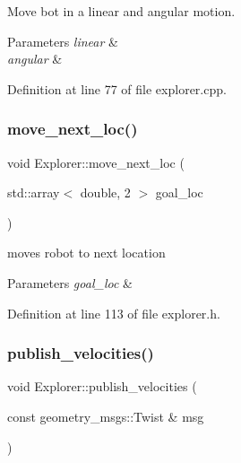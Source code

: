 Move bot in a linear and angular motion. 


\begin{DoxyParams}{Parameters}
{\em linear} & \\
\hline
{\em angular} & \\
\hline
\end{DoxyParams}


Definition at line 77 of file explorer.\+cpp.

\mbox{\label{class_explorer_a2b0c1e46e1a17e99f4156edf5a93b691}} 
\subsubsection{\texorpdfstring{move\+\_\+next\+\_\+loc()}{move\_next\_loc()}}
{\footnotesize\ttfamily void Explorer\+::move\+\_\+next\+\_\+loc (\begin{DoxyParamCaption}\item[{std\+::array$<$ double, 2 $>$}]{goal\+\_\+loc }\end{DoxyParamCaption})\hspace{0.3cm}{\ttfamily [inline]}}



moves robot to next location 


\begin{DoxyParams}{Parameters}
{\em goal\+\_\+loc} & \\
\hline
\end{DoxyParams}


Definition at line 113 of file explorer.\+h.

\mbox{\label{class_explorer_a8ffef25585ef957b9df4407366723787}} 
\subsubsection{\texorpdfstring{publish\+\_\+velocities()}{publish\_velocities()}}
{\footnotesize\ttfamily void Explorer\+::publish\+\_\+velocities (\begin{DoxyParamCaption}\item[{const geometry\+\_\+msgs\+::\+Twist \&}]{msg }\end{DoxyParamCaption})}



